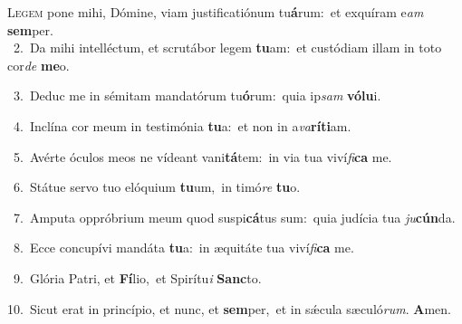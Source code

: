 \lettrine{\initial\textcolor{\initialcolor}{L}}{egem} pone mihi, Dómine, viam justificatiónum tu\-\textbf{á}\-rum:~\star et exquíram e\textit{am} \textbf{sem}\-per.\\
{\numbfont\textcolor{\numbcolor}{~2.}}~Da mihi intelléctum, et scrutábor legem \textbf{tu}\-am:~\star et custódiam illam in toto cor\textit{de} \textbf{me}\-o.\par
{\numbfont\textcolor{\numbcolor}{~3.}}~Deduc me in sémitam mandatórum tu\-\textbf{ó}\-rum:~\star quia ip\textit{sam} \textbf{vó}\-\textbf{lu}i.\par
{\numbfont\textcolor{\numbcolor}{~4.}}~Inclína cor meum in testimónia \textbf{tu}\-a:~\star et non in a\-\textit{va}\-\textbf{rí}\textbf{ti}am.\par
{\numbfont\textcolor{\numbcolor}{~5.}}~Avérte óculos meos ne vídeant vani\-\textbf{tá}\-tem:~\star in via tua viví\-\textit{fi}\-\textbf{ca} me.\par
{\numbfont\textcolor{\numbcolor}{~6.}}~Státue servo tuo elóquium \textbf{tu}\-um,~\star in timó\textit{re} \textbf{tu}\-o.\par
{\numbfont\textcolor{\numbcolor}{~7.}}~Amputa oppróbrium meum quod suspi\-\textbf{cá}\-tus sum:~\star quia judícia tua \textit{ju}\-\textbf{cún}da.\par
{\numbfont\textcolor{\numbcolor}{~8.}}~Ecce concupívi mandáta \textbf{tu}\-a:~\star in æquitáte tua viví\-\textit{fi}\-\textbf{ca} me.\par
{\numbfont\textcolor{\numbcolor}{~9.}}~Glória Patri, et \textbf{Fí}\-lio,~\star et Spirítu\textit{i} \textbf{Sanc}\-to.\par
{\numbfont\textcolor{\numbcolor}{10.}}~Sicut erat in princípio, et nunc, et \textbf{sem}\-per,~\star et in sǽcula sæculó\-\textit{rum}\-. \textbf{A}\-men.\par
